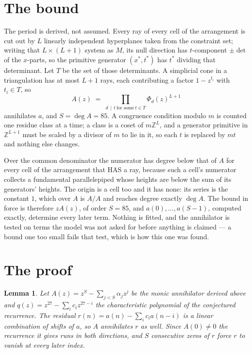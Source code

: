 \documentclass[11pt,a4paper]{article}
\theoremstyle{plain}
\newtheorem{lemma}[theorem]{Lemma}
\theoremstyle{definition}
\begin{document}
\section{The bound}

The period is derived, not assumed. Every ray of every cell of the arrangement is cut out by
$L$ linearly independent hyperplanes taken from the constraint set; writing that $L\times(L+1)$
system as $M$, its null direction has $t$-component $\pm\det$ of the $x$-parts, so the
primitive generator $(x^*,t^*)$ has $t^*$ dividing that determinant. Let $T$ be the set of
those determinants. A simplicial cone in a triangulation has at most $L+1$ rays, each
contributing a factor $1-z^{t_i}$ with $t_i\in T$, so
\[
A(z)\;=\;\prod_{d\,\mid\,t\ \text{for some}\ t\in T}\Phi_d(z)^{L+1}
\]
annihilates $a$, and $S=\deg A=85$. A congruence condition modulo $m$ is counted one residue
class at a time; a class is a coset of $m\mathbb{Z}^L$, and a generator primitive in
$\mathbb{Z}^{L+1}$ must be scaled by a divisor of $m$ to lie in it, so each $t$ is replaced
by $mt$ and nothing else changes.

Over the common denominator the numerator has degree below that of $A$ for every cell of the
arrangement that HAS a ray, because such a cell's numerator collects a fundamental
parallelepiped whose heights are below the sum of its generators' heights. The origin is a cell
too and it has none: its series is the constant $1$, which over $A$ is $A/A$ and reaches degree
exactly $\deg A$. The bound in force is therefore $zA(z)$, of order $S=85$, and
$a(0),\dots,a(S-1)$, computed exactly, determine every later term. Nothing is fitted, and the
annihilator is tested on terms the model was not asked for before anything is claimed --- a
bound one too small fails that test, which is how this one was found.

\section{The proof}

\begin{lemma}\label{lem:crit}
Let $A(z)=z^S-\sum_{j<S}\alpha_jz^{j}$ be the monic annihilator derived above and
$q(z)=z^{27}-\sum_ic_iz^{27-i}$ the characteristic polynomial of the conjectured
recurrence. The residual $r(n)=a(n)-\sum_ic_ia(n-i)$ is a linear combination of shifts of $a$,
so $A$ annihilates $r$ as well. Since $A(0)\ne0$ the recurrence it gives runs in both
directions, and $S$ consecutive zeros of $r$ force $r$ to vanish at every later index.
\end{lemma}
\end{document}
